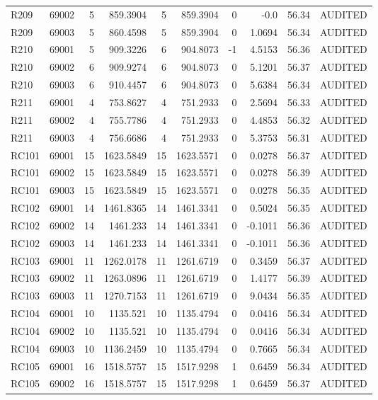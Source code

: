\begin{tabular}{lrrrrrrrrr}
R209 & 69002 & 5 & 859.3904 & 5 & 859.3904 & 0 & -0.0 & 56.34 & AUDITED \\
R209 & 69003 & 5 & 860.4598 & 5 & 859.3904 & 0 & 1.0694 & 56.34 & AUDITED \\
R210 & 69001 & 5 & 909.3226 & 6 & 904.8073 & -1 & 4.5153 & 56.36 & AUDITED \\
R210 & 69002 & 6 & 909.9274 & 6 & 904.8073 & 0 & 5.1201 & 56.37 & AUDITED \\
R210 & 69003 & 6 & 910.4457 & 6 & 904.8073 & 0 & 5.6384 & 56.34 & AUDITED \\
R211 & 69001 & 4 & 753.8627 & 4 & 751.2933 & 0 & 2.5694 & 56.33 & AUDITED \\
R211 & 69002 & 4 & 755.7786 & 4 & 751.2933 & 0 & 4.4853 & 56.32 & AUDITED \\
R211 & 69003 & 4 & 756.6686 & 4 & 751.2933 & 0 & 5.3753 & 56.31 & AUDITED \\
RC101 & 69001 & 15 & 1623.5849 & 15 & 1623.5571 & 0 & 0.0278 & 56.37 & AUDITED \\
RC101 & 69002 & 15 & 1623.5849 & 15 & 1623.5571 & 0 & 0.0278 & 56.39 & AUDITED \\
RC101 & 69003 & 15 & 1623.5849 & 15 & 1623.5571 & 0 & 0.0278 & 56.35 & AUDITED \\
RC102 & 69001 & 14 & 1461.8365 & 14 & 1461.3341 & 0 & 0.5024 & 56.35 & AUDITED \\
RC102 & 69002 & 14 & 1461.233 & 14 & 1461.3341 & 0 & -0.1011 & 56.36 & AUDITED \\
RC102 & 69003 & 14 & 1461.233 & 14 & 1461.3341 & 0 & -0.1011 & 56.36 & AUDITED \\
RC103 & 69001 & 11 & 1262.0178 & 11 & 1261.6719 & 0 & 0.3459 & 56.37 & AUDITED \\
RC103 & 69002 & 11 & 1263.0896 & 11 & 1261.6719 & 0 & 1.4177 & 56.39 & AUDITED \\
RC103 & 69003 & 11 & 1270.7153 & 11 & 1261.6719 & 0 & 9.0434 & 56.35 & AUDITED \\
RC104 & 69001 & 10 & 1135.521 & 10 & 1135.4794 & 0 & 0.0416 & 56.34 & AUDITED \\
RC104 & 69002 & 10 & 1135.521 & 10 & 1135.4794 & 0 & 0.0416 & 56.34 & AUDITED \\
RC104 & 69003 & 10 & 1136.2459 & 10 & 1135.4794 & 0 & 0.7665 & 56.34 & AUDITED \\
RC105 & 69001 & 16 & 1518.5757 & 15 & 1517.9298 & 1 & 0.6459 & 56.34 & AUDITED \\
RC105 & 69002 & 16 & 1518.5757 & 15 & 1517.9298 & 1 & 0.6459 & 56.37 & AUDITED \\

\end{tabular}
